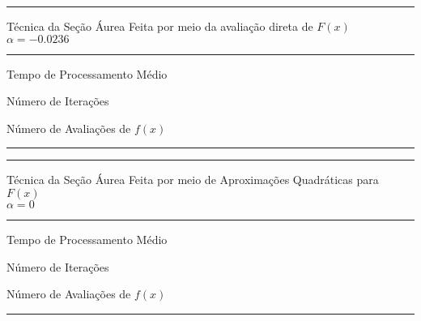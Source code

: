         \begin{minipage}[h!]{\linewidth}            
            \centering
            \hrule
            \vspace{2mm}
            Técnica da Seção Áurea Feita por meio da avaliação direta de $F(x)$ \\ $\alpha=-0.0236$
            \vspace{2mm}
            \noindent
            \hrule 
            \vspace{2mm}
            Tempo de Processamento Médio\\
            \label{tab:tblAa} 
            \writetablestt{\tblAa}\par
            \bigskip
            \centering
            Número de Iterações\\
            \label{tab:tblAb} 
            \writetablestt{\tblAb}\par
            \bigskip
            \centering
            Número de Avaliações de $f(x)$\\
            \label{tab:tblAc} 
            \writetablestt{\tblAc}\par
            \vspace{2mm}
            \hrule
            \vspace{2mm}
        \end{minipage}

        \begin{minipage}[h!]{\linewidth}
            \centering
            \hrule
            \vspace{2mm}
            Técnica da Seção Áurea Feita por meio de Aproximações Quadráticas para $F(x)$ \\ $\alpha=0$
            \vspace{2mm}
            \noindent
            \hrule 
            \vspace{2mm}
            Tempo de Processamento Médio\\
            \label{tab:tblBa} 
            \writetablestt{\tblBa}\par
            \bigskip
            \centering
            Número de Iterações\\
            \label{tab:tblBb} 
            \writetablestt{\tblBb}\par
            \bigskip
            \centering
            Número de Avaliações de $f(x)$\\
            \label{tab:tblBc} 
            \writetablestt{\tblBc}\par
            \vspace{2mm}
            \hrule
            \vspace{2mm}
        \end{minipage}

